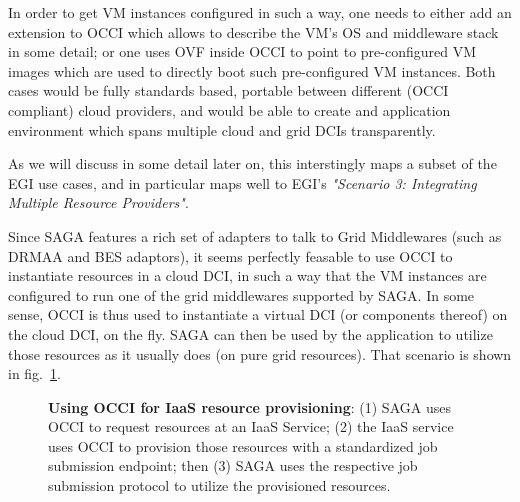 \documentclass[10pt,conference,final,letterpaper,twoside,twocolumn,]{IEEEtran}
\newcommand{\I}[1]{\textit{#1}}
\newcommand{\B}[1]{\textbf{#1}}
\begin{document}
 In order to get VM instances configured in such a way, one needs to
 either add an extension to OCCI which allows to describe the VM's OS
 and middleware stack in some detail; or one uses OVF inside OCCI to
 point to pre-configured VM images which are used to directly boot
 such pre-configured VM instances.  Both cases would be fully
 standards based, portable between different (OCCI compliant) cloud
 providers, and would be able to create and application environment
 which spans multiple cloud and grid DCIs transparently.

 As we will discuss in some detail later on, this interstingly maps a
 subset of the EGI use cases, and in particular maps well to EGI's
 \I{"Scenario 3: Integrating Multiple Resource Providers"}.
 
 Since SAGA features a rich set of adapters to talk to Grid
 Middlewares (such as DRMAA and BES adaptors), it seems perfectly
 feasable to use OCCI to instantiate resources in a cloud DCI, in such
 a way that the VM instances are configured to run one of the grid
 middlewares supported by SAGA.  In some sense, OCCI is thus used to
 instantiate a virtual DCI (or components thereof) on the cloud DCI,
 on the fly.  SAGA can then be used by the application to utilize
 those resources as it usually does (on pure grid resources).  That
 scenario is shown in fig.~\ref{fig:arch2}.

 \begin{figure}[h!]
  \caption{\footnotesize\label{fig:arch2} \B{Using OCCI for IaaS resource provisioning}: 
     (1) SAGA uses OCCI to request resources at an IaaS Service; 
     (2) the IaaS service uses OCCI to provision those resources 
          with a standardized job submission endpoint; then 
     (3) SAGA uses the respective job submission protocol to utilize 
     the provisioned resources.}
 \end{figure}
\end{document}
